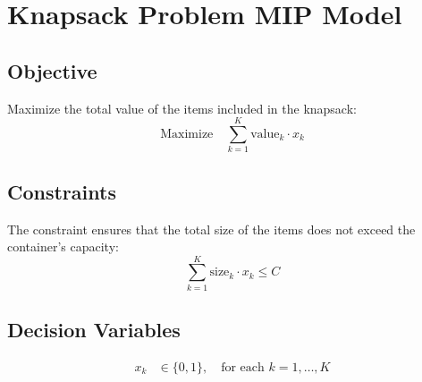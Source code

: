 \documentclass{article}
\begin{document}
\section*{Knapsack Problem MIP Model}

\subsection*{Objective}
Maximize the total value of the items included in the knapsack:
\[
\text{Maximize} \quad \sum_{k=1}^{K} \text{value}_k \cdot x_k
\]

\subsection*{Constraints}
The constraint ensures that the total size of the items does not exceed the container's capacity:
\[
\sum_{k=1}^{K} \text{size}_k \cdot x_k \leq C
\]

\subsection*{Decision Variables}
\begin{align*}
x_k & \in \{0, 1\}, \quad \text{for each } k = 1, \ldots, K 
\end{align*}
\end{document}
